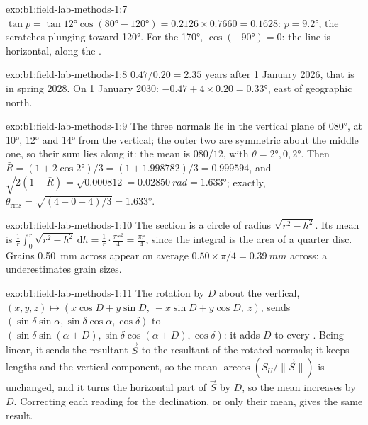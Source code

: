 \begin{solution}{exo:b1:field-lab-methods-1:7}
$\tan p = \tan\ang{12}\cos(\ang{80} - \ang{120}) = 0.2126\times0.7660 =
0.1628$: $p = \ang{9.2}$, the scratches plunging toward \ang{120}. For the
 \ang{170}, $\cos(\ang{-90}) = 0$: the line is horizontal, along the
.
\end{solution}

\begin{solution}{exo:b1:field-lab-methods-1:8}
$0.47/0.20 = 2.35$ years after 1 January 2026, that is in spring 2028. On
1 January 2030: $-0.47 + 4\times0.20 = \ang{+0.33}$, east of geographic north.
\end{solution}

\begin{solution}{exo:b1:field-lab-methods-1:9}
The three normals lie in the vertical plane of  \ang{080}, at
\ang{10}, \ang{12} and \ang{14} from the vertical; the outer two are
symmetric about the middle one, so their sum lies along it: the mean is
$080/12$, with $\theta = \ang{2}, 0, \ang{2}$. Then $\bar R = (1 +
2\cos\ang{2})/3 = (1 + 1.998782)/3 = 0.999594$, and $\sqrt{2(1 - \bar R)} =
\sqrt{0.000812} = \qty{0.02850}{rad} = \ang{1.633}$; exactly,
$\theta_{\text{rms}} = \sqrt{(4 + 0 + 4)/3} = \ang{1.633}$.
\end{solution}

\begin{solution}{exo:b1:field-lab-methods-1:10}
The section is a circle of radius $\sqrt{r^2 - h^2}$. Its mean is
$\frac1r\int_0^r\sqrt{r^2 - h^2}\,\mathrm dh = \frac1r\cdot\frac{\pi r^2}{4}
= \frac{\pi r}{4}$, since the integral is the area of a quarter disc. Grains
\qty{0.50}{mm} across appear on average $0.50\times\pi/4 = \qty{0.39}{mm}$
across: a  underestimates grain sizes.
\end{solution}

\begin{solution}{exo:b1:field-lab-methods-1:11}
The rotation by $D$ about the vertical,
$(x, y, z) \mapsto (x\cos D + y\sin D,\ -x\sin D + y\cos D,\ z)$, sends
$(\sin\delta\sin\alpha, \sin\delta\cos\alpha, \cos\delta)$ to
$(\sin\delta\sin(\alpha + D), \sin\delta\cos(\alpha + D), \cos\delta)$: it
adds $D$ to every . Being linear, it sends the resultant
$\vec S$ to the resultant of the rotated normals; it keeps lengths and the
vertical component, so the mean  $\arccos(S_U/\|\vec S\|)$ is unchanged,
and it turns the horizontal part of $\vec S$ by $D$, so the mean 
increases by $D$. Correcting each reading for the declination, or only their
mean, gives the same result.
\end{solution}

